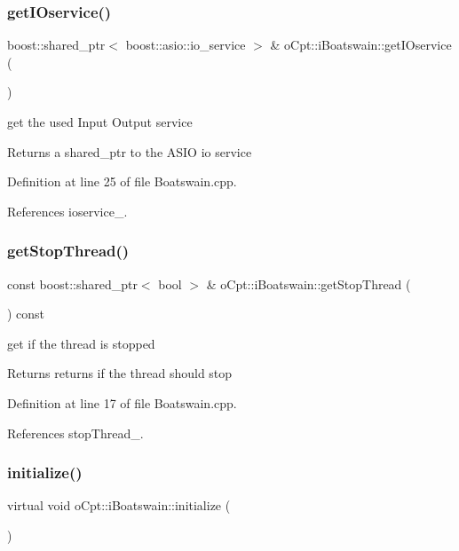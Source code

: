 \subsubsection{\texorpdfstring{get\+I\+Oservice()}{getIOservice()}}
{\footnotesize\ttfamily boost\+::shared\+\_\+ptr$<$ boost\+::asio\+::io\+\_\+service $>$ \& o\+Cpt\+::i\+Boatswain\+::get\+I\+Oservice (\begin{DoxyParamCaption}{ }\end{DoxyParamCaption})}

get the used Input Output service \begin{DoxyReturn}{Returns}
a shared\+\_\+ptr to the A\+S\+IO io service 
\end{DoxyReturn}


Definition at line 25 of file Boatswain.\+cpp.



References ioservice\+\_\+.

\hypertarget{classo_cpt_1_1i_boatswain_ad35f3f30f3430ce4c1790ca375565889}{}\label{classo_cpt_1_1i_boatswain_ad35f3f30f3430ce4c1790ca375565889} 
\subsubsection{\texorpdfstring{get\+Stop\+Thread()}{getStopThread()}}
{\footnotesize\ttfamily const boost\+::shared\+\_\+ptr$<$ bool $>$ \& o\+Cpt\+::i\+Boatswain\+::get\+Stop\+Thread (\begin{DoxyParamCaption}{ }\end{DoxyParamCaption}) const}

get if the thread is stopped \begin{DoxyReturn}{Returns}
returns if the thread should stop 
\end{DoxyReturn}


Definition at line 17 of file Boatswain.\+cpp.



References stop\+Thread\+\_\+.

\hypertarget{classo_cpt_1_1i_boatswain_a0749ff59de42e7a8a47586ab9d9ac98f}{}\label{classo_cpt_1_1i_boatswain_a0749ff59de42e7a8a47586ab9d9ac98f} 
\subsubsection{\texorpdfstring{initialize()}{initialize()}}
{\footnotesize\ttfamily virtual void o\+Cpt\+::i\+Boatswain\+::initialize (\begin{DoxyParamCaption}{ }\end{DoxyParamCaption})\hspace{0.3cm}{\ttfamily [pure virtual]}}

